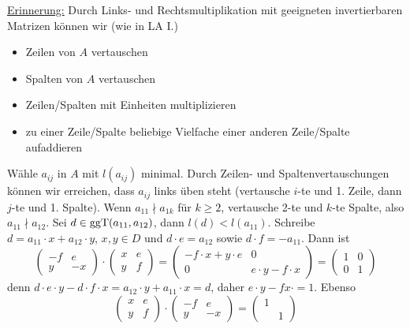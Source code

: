 \uline{Erinnerung:} Durch Links- und Rechtsmultiplikation mit geeigneten invertierbaren Matrizen können wir (wie in LA I.)
\begin{multicols}{2}
	\begin{itemize}
		\item Zeilen von $A$ vertauschen
		\item Spalten von $A$ vertauschen
		\item Zeilen/Spalten mit Einheiten multiplizieren
		\item zu einer Zeile/Spalte beliebige Vielfache einer anderen Zeile/Spalte aufaddieren 
	\end{itemize}
\end{multicols}
Wähle $a_{ij} $ in $A$ mit $l(a_{ij})$ minimal. Durch Zeilen- und Spaltenvertauschungen können wir erreichen, dass $a_{ij}$ links üben steht (vertausche $i$-te und 1.
Zeile, dann $j$-te und 1. Spalte). Wenn $a_{11} \nmid a_{1k}$ für $k \ge 2$, vertausche 2-te und $k$-te Spalte, also $a_11 \nmid a_{12}$. Sei $d \in \operatorname{ggT}(a_{11}, a_{12})$,
dann $l(d) < l(a_{11})$. Schreibe $d = a_{11} \cdot x + a_{12} \cdot y$, $x,y \in D$ und $d \cdot e = a_{12}$ sowie $ d \cdot f = - a_{11}$. Dann ist 
\[
	\begin{pmatrix}
		-f & e \\
		y & -x
	\end{pmatrix} \cdot \begin{pmatrix}
		x  & e \\
		y & f
	\end{pmatrix} = \begin{pmatrix}
		- f \cdot x + y \cdot e & 0 \\
		0 & e \cdot y - f \cdot x
	\end{pmatrix}
	= \begin{pmatrix}
		1 & 0 \\
		0 & 1
	\end{pmatrix}
\]
denn $d \cdot e \cdot y - d \cdot f \cdot x = a_{12} \cdot y + a_{11} \cdot x = d$, daher $e \cdot y- f x \cdot = 1$. Ebenso 
\[
	\begin{pmatrix}
		x & e \\
		y & f
	\end{pmatrix} \cdot \begin{pmatrix}
		- f & e \\
		y & -x
	\end{pmatrix} = \begin{pmatrix}
		1 & \\
		 & 1
	\end{pmatrix}
\]
